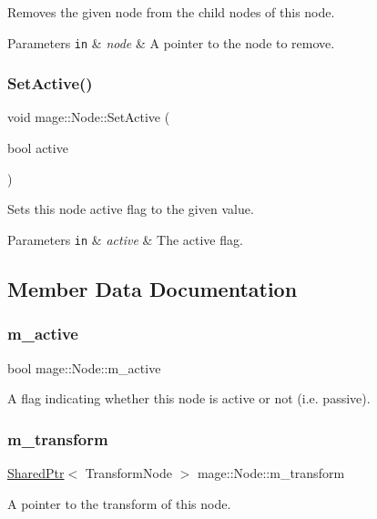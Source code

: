 Removes the given node from the child nodes of this node.


\begin{DoxyParams}[1]{Parameters}
\mbox{\tt in}  & {\em node} & A pointer to the node to remove. \\
\hline
\end{DoxyParams}
\hypertarget{classmage_1_1_node_af123050daa89e50f5468b630061aae53}{}\label{classmage_1_1_node_af123050daa89e50f5468b630061aae53} 
\subsubsection{\texorpdfstring{Set\+Active()}{SetActive()}}
{\footnotesize\ttfamily void mage\+::\+Node\+::\+Set\+Active (\begin{DoxyParamCaption}\item[{bool}]{active }\end{DoxyParamCaption})\hspace{0.3cm}{\ttfamily [noexcept]}}

Sets this node active flag to the given value.


\begin{DoxyParams}[1]{Parameters}
\mbox{\tt in}  & {\em active} & The active flag. \\
\hline
\end{DoxyParams}


\subsection{Member Data Documentation}
\hypertarget{classmage_1_1_node_ac4dd6c399de8b2a92df92365df7ecdac}{}\label{classmage_1_1_node_ac4dd6c399de8b2a92df92365df7ecdac} 
\subsubsection{\texorpdfstring{m\+\_\+active}{m\_active}}
{\footnotesize\ttfamily bool mage\+::\+Node\+::m\+\_\+active\hspace{0.3cm}{\ttfamily [private]}}

A flag indicating whether this node is active or not (i.\+e. passive). \hypertarget{classmage_1_1_node_a0b8161cc8480dcd9340309c3773c49f2}{}\label{classmage_1_1_node_a0b8161cc8480dcd9340309c3773c49f2} 
\subsubsection{\texorpdfstring{m\+\_\+transform}{m\_transform}}
{\footnotesize\ttfamily \hyperlink{namespacemage_a1e01ae66713838a7a67d30e44c67703e}{Shared\+Ptr}$<$ Transform\+Node $>$ mage\+::\+Node\+::m\+\_\+transform\hspace{0.3cm}{\ttfamily [private]}}

A pointer to the transform of this node. 